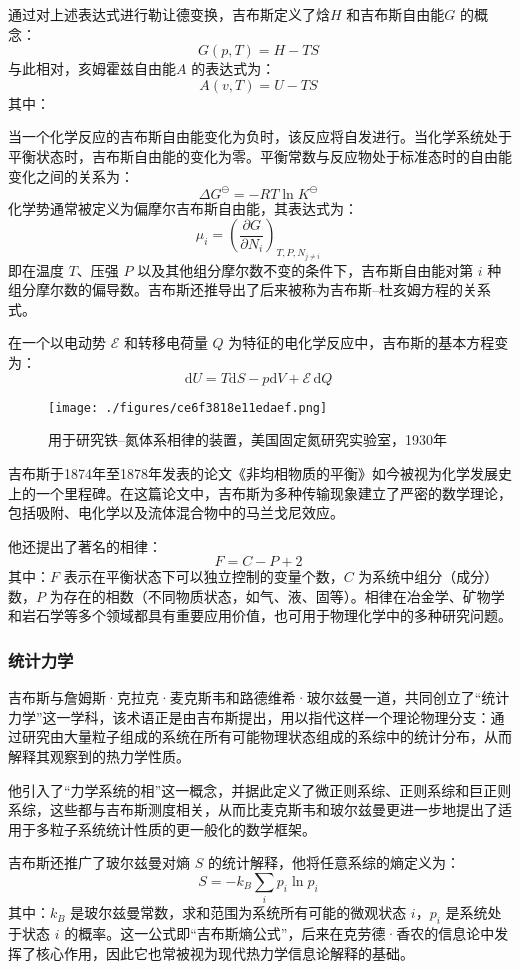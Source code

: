 通过对上述表达式进行勒让德变换，吉布斯定义了焓$H$ 和吉布斯自由能$G$ 的概念：
$$
G(p, T) = H - T S~
$$
与此相对，亥姆霍兹自由能$A$ 的表达式为：
$$
A(v, T) = U - T S~
$$
其中：

当一个化学反应的吉布斯自由能变化为负时，该反应将自发进行。当化学系统处于平衡状态时，吉布斯自由能的变化为零。平衡常数与反应物处于标准态时的自由能变化之间的关系为：
$$
\Delta G^\ominus = -RT \ln K^\ominus~
$$
化学势通常被定义为偏摩尔吉布斯自由能，其表达式为：
$$
\mu_i = \left( \frac{\partial G}{\partial N_i} \right)_{T, P, N_{j \ne i}}~
$$
即在温度 $T$、压强 $P$ 以及其他组分摩尔数不变的条件下，吉布斯自由能对第 $i$ 种组分摩尔数的偏导数。吉布斯还推导出了后来被称为吉布斯–杜亥姆方程的关系式。

在一个以电动势 $\mathcal{E}$ 和转移电荷量 $Q$ 为特征的电化学反应中，吉布斯的基本方程变为：
$$
\mathrm{d}U = T\mathrm{d}S - p\mathrm{d}V + \mathcal{E}\,\mathrm{d}Q~
$$
\begin{figure}[ht]
\centering
\texttt{[image: ./figures/ce6f3818e11edaef.png]}
\caption{用于研究铁–氮体系相律的装置，美国固定氮研究实验室，1930年} \label{fig_QSY_7}
\end{figure}
吉布斯于1874年至1878年发表的论文《非均相物质的平衡》如今被视为化学发展史上的一个里程碑。在这篇论文中，吉布斯为多种传输现象建立了严密的数学理论，包括吸附、电化学以及流体混合物中的马兰戈尼效应。

他还提出了著名的相律：
$$
F = C - P + 2~
$$
其中：$F$ 表示在平衡状态下可以独立控制的变量个数，$C$ 为系统中组分（成分）数，$P$ 为存在的相数（不同物质状态，如气、液、固等）。相律在冶金学、矿物学和岩石学等多个领域都具有重要应用价值，也可用于物理化学中的多种研究问题。
\subsubsection{统计力学}
吉布斯与詹姆斯·克拉克·麦克斯韦和路德维希·玻尔兹曼一道，共同创立了“统计力学”这一学科，该术语正是由吉布斯提出，用以指代这样一个理论物理分支：通过研究由大量粒子组成的系统在所有可能物理状态组成的系综中的统计分布，从而解释其观察到的热力学性质。

他引入了“力学系统的相”这一概念，并据此定义了微正则系综、正则系综和巨正则系综，这些都与吉布斯测度相关，从而比麦克斯韦和玻尔兹曼更进一步地提出了适用于多粒子系统统计性质的更一般化的数学框架。

吉布斯还推广了玻尔兹曼对熵 $S$ 的统计解释，他将任意系综的熵定义为：
$$
S = -k_B \sum_i p_i \ln p_i~
$$
其中：$k_B$ 是玻尔兹曼常数，求和范围为系统所有可能的微观状态 $i$，$p_i$ 是系统处于状态 $i$ 的概率。这一公式即“吉布斯熵公式”，后来在克劳德·香农的信息论中发挥了核心作用，因此它也常被视为现代热力学信息论解释的基础。

